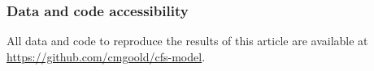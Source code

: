 \documentclass[12pt]{article}
\begin{document}
\subsubsection*{Data and code accessibility}
All data and code to reproduce the results of this article are available at \href{https://github.com/cmgoold/cfs-model}{https://github.com/cmgoold/cfs-model}.



\end{document}
